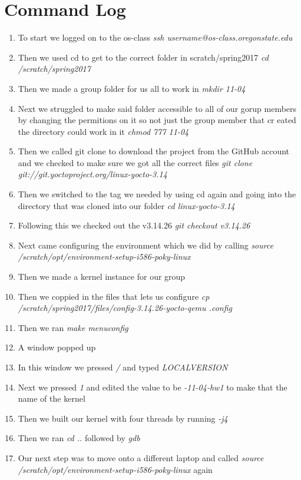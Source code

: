 \section{Command Log}
\begin{enumerate}
    \item To start we logged on to the os-class \textit{ssh username@os-class.oregonstate.edu}
    \item Then we used cd to get to the correct folder in scratch/spring2017 \textit{cd /scratch/spring2017}
    \item Then we made a group folder for us all to work in \textit{mkdir 11-04}
    \item Next we struggled to make said folder accessible to all of our gorup members by changing the permitions on it so not just the group member that cr    eated the directory could work in it \textit{chmod 777 11-04}
    \item Then we called git clone to download the project from the GitHub account and we checked to make sure we got all the correct files \textit{git clone git://git.yoctoproject.org/linux-yocto-3.14}
    \item Then we switched to the tag we needed by using cd again and going into the directory that was cloned into our folder \textit{cd linux-yocto-3.14}
    \item Following this we checked out the v3.14.26 \textit{git checkout v3.14.26}
    \item Next came configuring the environment which we did by calling \textit{source /scratch/opt/environment-setup-i586-poky-linux}
    \item Then we made a kernel instance for our group
    \item Then we coppied in the files that lets us configure \textit{cp /scratch/spring2017/files/config-3.14.26-yocto-qemu .config}
    \item Then we ran \textit{make menuconfig}
    \item A window popped up
    \item In this window we pressed \textit{/} and typed \textit{LOCALVERSION}
    \item Next we pressed \textit{1} and edited the value to be \textit{-11-04-hw1} to make that the name of the kernel
    \item Then we built our kernel with four threads by running \textit{-j4}
    \item Then we ran \textit{cd ..} followed by \textit{gdb}
    \item Our next step was to move onto a different laptop and called \textit{source /scratch/opt/environment-setup-i586-poky-linux } again

\end{enumerate}
